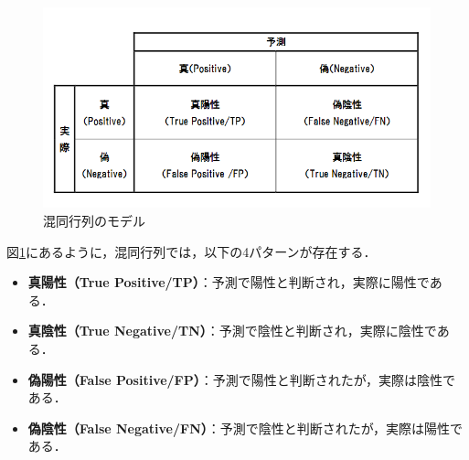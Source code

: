 \documentclass[a4j, 11pt]{jsarticle}
\numberwithin{equation}{section}
\begin{document}
\begin{figure}[htbp]
    \centering
    \mbox{{\includegraphics[scale=0.7]{fig7_CM.png}}}
    \caption{混同行列のモデル}
    \label{CM}
\end{figure}

\indent 図\ref{CM}にあるように，混同行列では，以下の4パターンが存在する．\\
\begin {itemize}
\item \textbf{真陽性（True Positive/TP）}：予測で陽性と判断され，実際に陽性である．
\item \textbf{真陰性（True Negative/TN）}：予測で陰性と判断され，実際に陰性である．
\item \textbf{偽陽性（False Positive/FP）}：予測で陽性と判断されたが，実際は陰性である．
\item \textbf{偽陰性（False Negative/FN）}：予測で陰性と判断されたが，実際は陽性である．
\end{itemize}
\end{document}
